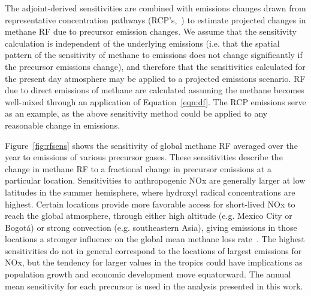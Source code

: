 The adjoint-derived sensitivities are combined with emissions changes drawn from representative concentration pathways (RCP's,~\citet{ref:lamarque2011,ref:vanvuuren2011}) to estimate projected changes in methane RF due to precursor emission changes. We assume that the sensitivity calculation is independent of the underlying emissions (i.e. that the spatial pattern of the sensitivity of methane to emissions does not change significantly if the precursor emissions change), and therefore that the sensitivities calculated for the present day atmosphere may be applied to a projected emissions scenario. RF due to direct emissions of methane are calculated assuming the methane becomes well-mixed through an application of Equation~\ref{eqn:df}. The RCP emissions serve as an example, as the above sensitivity method could be applied to any reasonable change in emissions.

Figure~\ref{fig:rfsens} shows the sensitivity of global methane RF averaged over the year to emissions of various precursor gases. These sensitivities describe the change in methane RF to a fractional change in precursor emissions at a particular location. Sensitivities to anthropogenic NOx are generally larger at low latitudes in the summer hemisphere, where hydroxyl radical concentrations are highest. Certain locations provide more favorable access for short-lived NOx to reach the global atmosphere, through either high altitude (e.g. Mexico City or Bogot\'a) or strong convection (e.g. southeastern Asia), giving emissions in those locations a stronger influence on the global mean methane loss rate~\citep{ref:bowman2012}. The highest sensitivities do not in general correspond to the locations of largest emissions for NOx, but the tendency for larger values in the tropics could have implications as population growth and economic development move equatorward. The annual mean sensitivity for each precursor is used in the analysis presented in this work.

